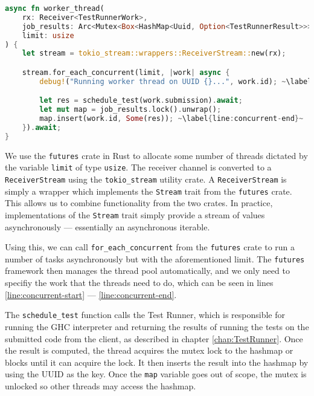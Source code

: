 \begin{lstlisting}[language=rust, escapechar=~, caption={Rust code showing allocation of thread pools and scheduling of code submission processing}, label={lst:worker-thread}]
async fn worker_thread(
    rx: Receiver<TestRunnerWork>,
    job_results: Arc<Mutex<Box<HashMap<Uuid, Option<TestRunnerResult>>>>>,
    limit: usize
) {
    let stream = tokio_stream::wrappers::ReceiverStream::new(rx);

    stream.for_each_concurrent(limit, |work| async {
        debug!("Running worker thread on UUID {}...", work.id); ~\label{line:concurrent-start}~

        let res = schedule_test(work.submission).await;
        let mut map = job_results.lock().unwrap();
        map.insert(work.id, Some(res)); ~\label{line:concurrent-end}~
    }).await;
}
\end{lstlisting}

We use the \texttt{futures} crate in Rust to allocate some number of threads dictated by the variable \texttt{limit} of type \texttt{usize}.
The receiver channel is converted to a \texttt{ReceiverStream} using the \texttt{tokio\_stream} utility crate.
A \texttt{ReceiverStream} is simply a wrapper which implements the \texttt{Stream} trait from the \texttt{futures} crate.
This allows us to combine functionality from the two crates.
In practice, implementations of the \texttt{Stream} trait simply provide a stream of values asynchronously --- essentially an asynchronous iterable.

Using this, we can call \texttt{for\_each\_concurrent} from the \texttt{futures} crate to run a number of tasks asynchronously but with the aforementioned limit.
The \texttt{futures} framework then manages the thread pool automatically, and we only need to specifiy the work that the threads need to do, which can be seen in lines \ref{line:concurrent-start} --- \ref{line:concurrent-end}.

The \texttt{schedule\_test} function calls the Test Runner, which is responsible for running the GHC interpreter and returning the results of running the tests on the submitted code from the client, as described in chapter \ref{chap:TestRunner}.
Once the result is computed, the thread acquires the mutex lock to the hashmap or blocks until it can acquire the lock.
It then inserts the result into the hashmap by using the UUID as the key.
Once the \texttt{map} variable goes out of scope, the mutex is unlocked so other threads may access the hashmap.

